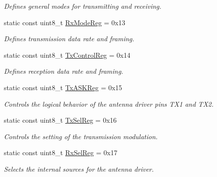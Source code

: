 \begin{DoxyCompactItemize}
\begin{DoxyCompactList}\small\item\em Defines general modes for transmitting and receiving. \end{DoxyCompactList}\item 
\mbox{\label{classMFRC522_afa09626edf95b29b5a0a2704163856c4}} 
static const uint8\+\_\+t \hyperlink{classMFRC522_afa09626edf95b29b5a0a2704163856c4}{Rx\+Mode\+Reg} = 0x13
\begin{DoxyCompactList}\small\item\em Defines transmission data rate and framing. \end{DoxyCompactList}\item 
\mbox{\label{classMFRC522_a31362c1d22f22ba49b0154cd91d9a1f8}} 
static const uint8\+\_\+t \hyperlink{classMFRC522_a31362c1d22f22ba49b0154cd91d9a1f8}{Tx\+Control\+Reg} = 0x14
\begin{DoxyCompactList}\small\item\em Defines reception data rate and framing. \end{DoxyCompactList}\item 
\mbox{\label{classMFRC522_a6be33368376daa7fca206ef5847eae70}} 
static const uint8\+\_\+t \hyperlink{classMFRC522_a6be33368376daa7fca206ef5847eae70}{Tx\+A\+S\+K\+Reg} = 0x15
\begin{DoxyCompactList}\small\item\em Controls the logical behavior of the antenna driver pins T\+X1 and T\+X2. \end{DoxyCompactList}\item 
\mbox{\label{classMFRC522_aed95c578c94a3aebe377736621b80bda}} 
static const uint8\+\_\+t \hyperlink{classMFRC522_aed95c578c94a3aebe377736621b80bda}{Tx\+Sel\+Reg} = 0x16
\begin{DoxyCompactList}\small\item\em Controls the setting of the transmission modulation. \end{DoxyCompactList}\item 
\mbox{\label{classMFRC522_ac2c0cc7b2d5068c85074acc23a648304}} 
static const uint8\+\_\+t \hyperlink{classMFRC522_ac2c0cc7b2d5068c85074acc23a648304}{Rx\+Sel\+Reg} = 0x17
\begin{DoxyCompactList}\small\item\em Selects the internal sources for the antenna driver. \end{DoxyCompactList}\item 

\end{DoxyCompactItemize}
